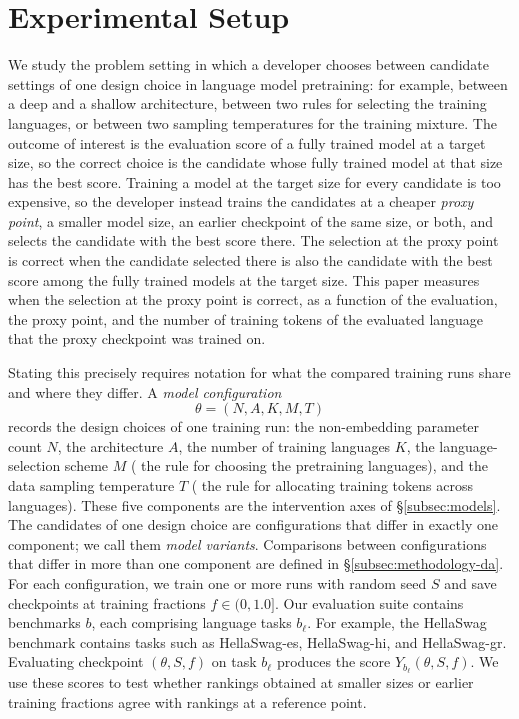 \section{Experimental Setup}
\label{sec:methodology}
We study the problem setting in which a developer chooses between candidate settings of one design choice in language model pretraining: for example, between a deep and a shallow architecture, between two rules for selecting the training languages, or between two sampling temperatures for the training mixture. The outcome of interest is the evaluation score of a fully trained model at a target size, so the correct choice is the candidate whose fully trained model at that size has the best score. Training a model at the target size for every candidate is too expensive, so the developer instead trains the candidates at a cheaper \emph{proxy point}, a smaller model size, an earlier checkpoint of the same size, or both, and selects the candidate with the best score there. The selection at the proxy point is correct when the candidate selected there is also the candidate with the best score among the fully trained models at the target size. This paper measures when the selection at the proxy point is correct, as a function of the evaluation, the proxy point, and the number of training tokens of the evaluated language that the proxy checkpoint was trained on.

Stating this precisely requires notation for what the compared training runs share and where they differ. A \emph{model configuration}
\[
\theta=(N,A,K,M,T)
\]
records the design choices of one training run: the non-embedding parameter count $N$, the architecture $A$, the number of training languages $K$, the language-selection scheme $M$ (\ie{} the rule for choosing the pretraining languages), and the data sampling temperature $T$ (\ie{} the rule for allocating training tokens across languages).
These five components are the intervention axes of \S\ref{subsec:models}. The candidates of one design choice are configurations that differ in exactly one component; we call them \emph{model variants}. Comparisons between configurations that differ in more than one component are defined in \S\ref{subsec:methodology-da}.
For each configuration, we train one or more runs with random seed $S$ and save checkpoints at training fractions $f\in (0,1.0]$.
Our evaluation suite contains benchmarks $b$, each comprising language tasks $b_\ell$. For example, the HellaSwag benchmark contains tasks such as HellaSwag-es, HellaSwag-hi, and HellaSwag-gr. Evaluating checkpoint $(\theta,S,f)$ on task $b_\ell$ produces the score
$Y_{b_\ell}(\theta,S,f)$.
We use these scores to test whether rankings obtained at smaller sizes or earlier training fractions agree with rankings at a reference point.


